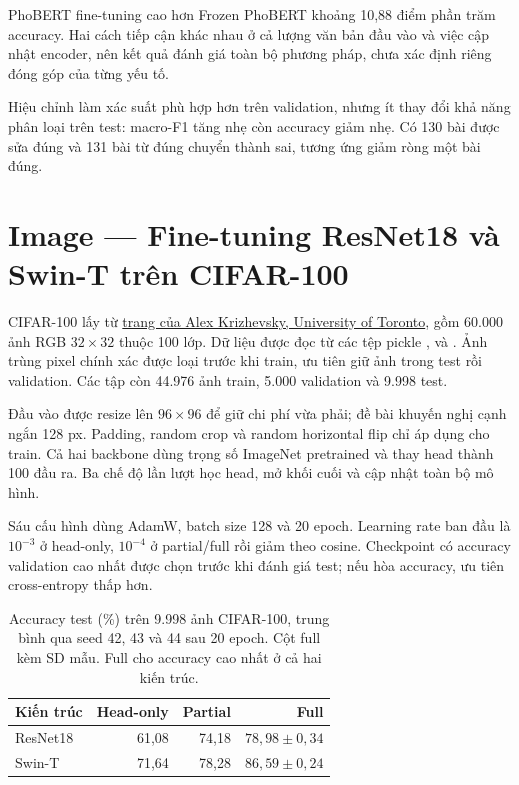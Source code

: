 \documentclass[12pt,a4paper]{report}
\begin{document}
PhoBERT fine-tuning cao hơn Frozen PhoBERT khoảng 10,88 điểm phần trăm accuracy. Hai cách tiếp cận khác nhau ở cả lượng văn bản đầu vào và việc cập nhật encoder, nên kết quả đánh giá toàn bộ phương pháp, chưa xác định riêng đóng góp của từng yếu tố.

Hiệu chỉnh làm xác suất phù hợp hơn trên validation, nhưng ít thay đổi khả năng phân loại trên test: macro-F1 tăng nhẹ còn accuracy giảm nhẹ. Có 130 bài được sửa đúng và 131 bài từ đúng chuyển thành sai, tương ứng giảm ròng một bài đúng.

\section{Image — Fine-tuning ResNet18 và Swin-T trên CIFAR-100}
CIFAR-100 lấy từ \href{https://www.cs.toronto.edu/~kriz/cifar.html}{trang của Alex Krizhevsky, University of Toronto}, gồm 60.000 ảnh RGB $32\times32$ thuộc 100 lớp. Dữ liệu được đọc từ các tệp pickle ,  và . Ảnh trùng pixel chính xác được loại trước khi train, ưu tiên giữ ảnh trong test rồi validation. Các tập còn 44.976 ảnh train, 5.000 validation và 9.998 test.

Đầu vào được resize lên $96\times96$ để giữ chi phí vừa phải; đề bài khuyến nghị cạnh ngắn 128 px. Padding, random crop và random horizontal flip chỉ áp dụng cho train. Cả hai backbone dùng trọng số ImageNet pretrained và thay head thành 100 đầu ra. Ba chế độ lần lượt học head, mở khối cuối và cập nhật toàn bộ mô hình.

Sáu cấu hình dùng AdamW, batch size 128 và 20 epoch. Learning rate ban đầu là $10^{-3}$ ở head-only, $10^{-4}$ ở partial/full rồi giảm theo cosine. Checkpoint có accuracy validation cao nhất được chọn trước khi đánh giá test; nếu hòa accuracy, ưu tiên cross-entropy thấp hơn.

\begin{table}[htbp]\centering
\begin{tabular}{@{}lrrr@{}}\toprule
Kiến trúc & Head-only & Partial & Full\\\midrule
ResNet18 & 61,08 & 74,18 & $78{,}98\pm0{,}34$\\
Swin-T & 71,64 & 78,28 & $86{,}59\pm0{,}24$\\\bottomrule
\end{tabular}
\caption{Accuracy test (\%) trên 9.998 ảnh CIFAR-100, trung bình qua seed 42, 43 và 44 sau 20 epoch. Cột full kèm SD mẫu. Full cho accuracy cao nhất ở cả hai kiến trúc.}
\end{table}
\end{document}
